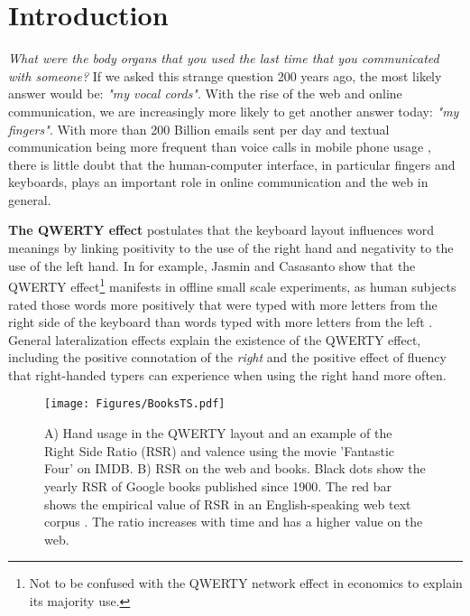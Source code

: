 \documentclass[letterpaper]{sig-alternate-2013}
\begin{document}



\section{Introduction}

\emph{What were the body organs that you used the last time that you
communicated with someone?} If we asked this strange question 200 years ago,
the most likely answer would be: \emph{"my vocal cords"}. With the rise of the
web and online communication, we are increasingly more likely to get another
answer today: \emph{"my fingers"}.  With more than 200 Billion emails sent per
day \cite{Radicati2015} and textual communication being more frequent than
voice calls in mobile phone usage \cite{Smith2011}, there is little doubt that
the human-computer interface, in  particular fingers and keyboards, plays an
important role in online communication and the web in general.


\textbf{The QWERTY effect} postulates that the keyboard layout influences word
meanings by linking positivity to the use of the right hand and negativity to
the use of the left hand. In \cite{Jasmin2012} for example, Jasmin and
Casasanto show that the QWERTY effect\footnote{Not to be confused with the
QWERTY network effect in economics to explain its majority use.} manifests in offline small scale
experiments, as human subjects rated those words more positively that were typed with more
letters from the right side of the keyboard than words typed with more letters
from the left \cite{Jasmin2012,Casasanto2014}. General lateralization effects
explain the existence of the QWERTY effect, including the positive connotation
of the \emph{right} \cite{Casasanto2014b} and the positive effect of fluency
that right-handed typers can experience when using the right hand more often.


\begin{figure*}[t] \centering
\texttt{[image: Figures/BooksTS.pdf]}\\ \caption{ A)
Hand usage in the QWERTY layout and an example of the Right Side Ratio (RSR) and
valence  using the movie 'Fantastic Four' on IMDB. B) RSR on the web and books. Black
dots show the yearly RSR of Google books \cite{Lin2012} published since 1900.
The red bar shows the empirical value of RSR in an English-speaking web text
corpus \cite{Jakubivcek2013}. The ratio increases with time and has a higher
value on the web. \label{fig:BooksTS}} \end{figure*}
\end{document}
